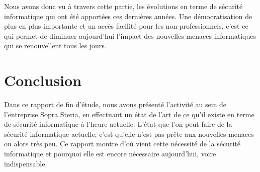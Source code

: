 \documentclass[a4paper]{memoir}
\begin{document}
Nous avons donc vu à travers cette partie, les évolutions en terme de sécurité informatique qui ont été apportées ces dernières années. 
Une démocratisation de plus en plus importante et un accès facilité pour les non-professionnels, c'est ce qui permet de diminuer aujourd'hui l'impact des nouvelles menaces informatiques qui se renouvellent tous les jours.




\chapter*{Conclusion}

Dans ce rapport de fin d'étude, nous avons présenté l'activité au sein de l'entreprise Sopra Steria, en effectuant un état de l'art de ce qu'il existe en terme de sécurité informatique à l'heure actuelle.
L'état que l'on peut faire de la sécurité informatique actuelle, c'est qu'elle n'est pas prête aux nouvelles menaces ou alors très peu. Ce rapport montre d'où vient cette nécessité de la sécurité informatique et pourquoi elle est encore nécessaire aujourd'hui, voire indispensable.
\end{document}
